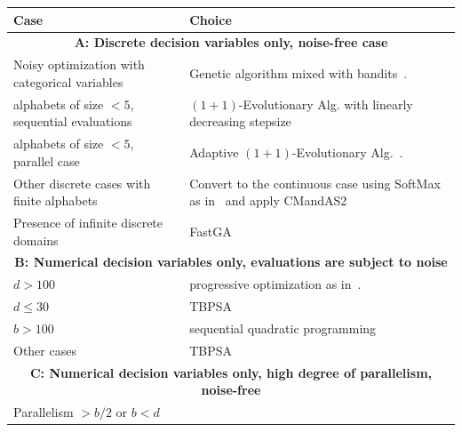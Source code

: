 \begin{algorithm*}[t]
\scriptsize
\centering
\begin{tabular}{p{}|p{}}%
\textbf{Case} & \textbf{Choice} \\
\hline
		  \hline
		  \multicolumn{2}{c}{{\textbf{A: Discrete decision variables only, {noise-free case}}}}\\%
		  \hline
{Noisy optimization with categorical variables}
		     & {Genetic algorithm mixed with bandits~\cite{igel,versatile}.} \\
		 alphabets of size $<5$, sequential evaluations  & 
		 {$(1+1)$-Evolutionary Alg. with linearly decreasing stepsize}\\
		 {%
		 alphabets of size $<5$, parallel case} & {Adaptive $(1+1)$-Evolutionary Alg.~\cite{adaptivecarola}.}\\
		 {Other discrete cases with finite alphabets} &{Convert to the continuous case using SoftMax as in~\cite{versatile} and apply CMandAS2~\cite{gecco2019} }\\
		 {Presence of infinite discrete domains}&
		 {FastGA \cite{fastga}}
		  \\
		  \hline
 \multicolumn{2}{c}{{\textbf{B: Numerical decision variables only, evaluations are subject to noise}}}\\%
		  \hline
		 {$d>100$} &
		 {progressive optimization as in~\cite{berthierDE}.}
		  \\
		 {$d\le 30$}&
		 {TBPSA~\cite{beyerhellwignoise}}
		  \\
        {$b>100$}&    
		 {sequential quadratic programming}
		  \\
        {Other cases}  &
		 {TBPSA~\cite{beyerhellwignoise}}
		  \\
		 		  \hline
		  \multicolumn{2}{c}{{\textbf{C: Numerical decision variables only, high degree of parallelism, {noise-free}}}}\\%
		  \hline 
		 {Parallelism $>b/2$ or $b<d$ }&

\end{tabular}
\end{algorithm*}

